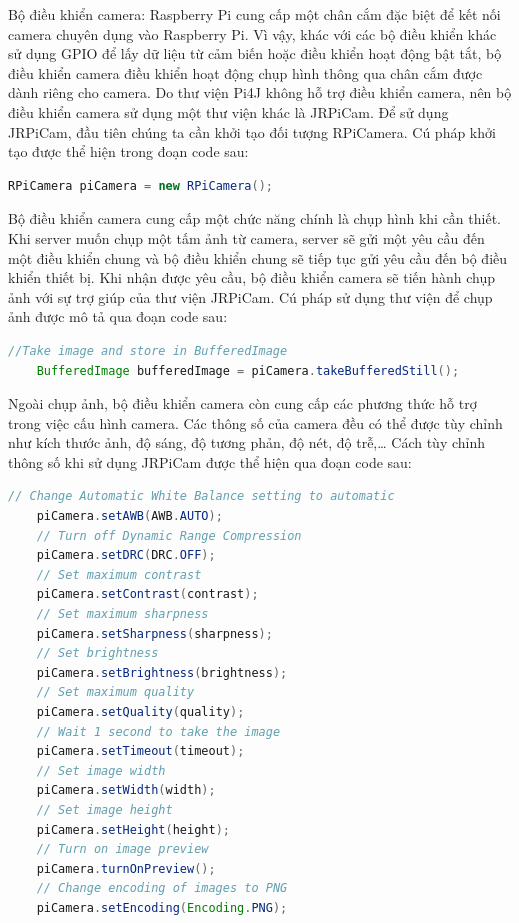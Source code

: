 \documentclass[12pt,a4paper,oneside]{extbook}
\begin{document}
Bộ điều khiển camera: Raspberry Pi cung cấp một chân cắm đặc biệt để kết nối camera chuyên dụng vào Raspberry Pi. Vì vậy, khác với các bộ điều khiển khác sử dụng GPIO để lấy dữ liệu từ cảm biến hoặc điều khiển hoạt động bật tắt, bộ điều khiển camera điều khiển hoạt động chụp hình thông qua chân cắm được dành riêng cho camera. Do thư viện Pi4J không hỗ trợ điều khiển camera, nên bộ điều khiển camera sử dụng một thư viện khác là JRPiCam. Để sử dụng JRPiCam, đầu tiên chúng ta cần khởi tạo đối tượng RPiCamera. Cú pháp khởi tạo được thể hiện trong đoạn code sau:

\begin{lstlisting}[language=Java, label={lst:declare-camera}]
	RPiCamera piCamera = new RPiCamera();
\end{lstlisting}

Bộ điều khiển camera cung cấp một chức năng chính là chụp hình khi cần thiết. Khi server muốn chụp một tấm ảnh từ camera, server sẽ gửi một yêu cầu đến một điều khiển chung và bộ điều khiển chung sẽ tiếp tục gửi yêu cầu đến bộ điều khiển thiết bị. Khi nhận được yêu cầu, bộ điều khiển camera sẽ tiến hành chụp ảnh với sự trợ giúp của thư viện JRPiCam. Cú pháp sử dụng thư viện để chụp ảnh được mô tả qua đoạn code sau:

\begin{lstlisting}[language=Java, label={lst:camera-take-picture}]
	//Take image and store in BufferedImage
	BufferedImage bufferedImage = piCamera.takeBufferedStill();
\end{lstlisting}

Ngoài chụp ảnh, bộ điều khiển camera còn cung cấp các phương thức hỗ trợ trong việc cấu hình camera. Các thông số của camera đều có thể được tùy chỉnh như kích thước ảnh, độ sáng, độ tương phản, độ nét, độ trễ,\dots\hspace{0mm} Cách tùy chỉnh thông số khi sử dụng JRPiCam được thể hiện qua đoạn code sau:

\begin{lstlisting}[language=Java, label={lst:camera-take-picture}]
	// Change Automatic White Balance setting to automatic 
	piCamera.setAWB(AWB.AUTO);
	// Turn off Dynamic Range Compression
	piCamera.setDRC(DRC.OFF);
	// Set maximum contrast
	piCamera.setContrast(contrast);
	// Set maximum sharpness
	piCamera.setSharpness(sharpness);
	// Set brightness
	piCamera.setBrightness(brightness);
	// Set maximum quality
	piCamera.setQuality(quality);
	// Wait 1 second to take the image
	piCamera.setTimeout(timeout);
	// Set image width
	piCamera.setWidth(width);
	// Set image height
	piCamera.setHeight(height);
	// Turn on image preview
	piCamera.turnOnPreview();
	// Change encoding of images to PNG
	piCamera.setEncoding(Encoding.PNG);
\end{lstlisting}
\end{document}
